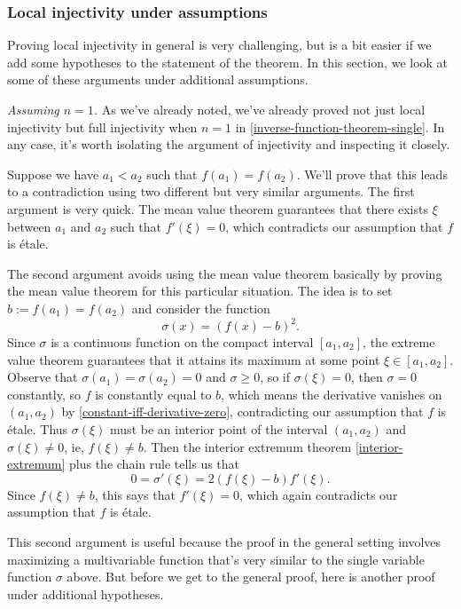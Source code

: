 \subsubsection*{Local injectivity under assumptions}

Proving local injectivity in general is very challenging, but is a bit easier if we add some hypotheses to the statement of the theorem. In this section, we look at some of these arguments under additional assumptions. 

\mbox{}

\noindent \textit{Assuming $n = 1$.} As we've already noted, we've already proved not just local injectivity but full injectivity when $n = 1$ in \cref{inverse-function-theorem-single}. In any case, it's worth isolating the argument of injectivity and inspecting it closely. 

Suppose we have $a_1 < a_2$ such that $f(a_1) = f(a_2)$. We'll prove that this leads to a contradiction using two different but very similar arguments. The first argument is very quick. The mean value theorem guarantees that there exists $\xi$ between $a_1$ and $a_2$ such that $f'(\xi) = 0$, which contradicts our assumption that $f$ is \'etale. 

The second argument avoids using the mean value theorem basically by proving the mean value theorem for this particular situation. The idea is to set $b := f(a_1) = f(a_2)$ and consider the function \[ \sigma(x) = (f(x)-b)^2. \]
Since $\sigma$ is a continuous function on the compact interval $[a_1, a_2]$, the extreme value theorem guarantees that it attains its maximum at some point $\xi \in [a_1, a_2]$. Observe that $\sigma(a_1) = \sigma(a_2) = 0$ and $\sigma \geq 0$, so if $\sigma(\xi) = 0$, then $\sigma = 0$ constantly, so $f$ is constantly equal to $b$, which means the derivative vanishes on $(a_1, a_2)$ by \cref{constant-iff-derivative-zero}, contradicting our assumption that $f$ is \'etale. Thus $\sigma(\xi)$ must be an interior point of the interval $(a_1, a_2)$ and $\sigma(\xi) \neq 0$, ie, $f(\xi) \neq b$. Then the interior extremum theorem \ref{interior-extremum} plus the chain rule tells us that
\[ 0 = \sigma'(\xi) = 2(f(\xi) - b)f'(\xi).  \]
Since $f(\xi) \neq b$, this says that $f'(\xi) = 0$, which again contradicts our assumption that $f$ is \'etale. 

This second argument is useful because the proof in the general setting involves maximizing a multivariable function that's very similar to the single variable function $\sigma$ above. But before we get to the general proof, here is another proof under additional hypotheses. 

